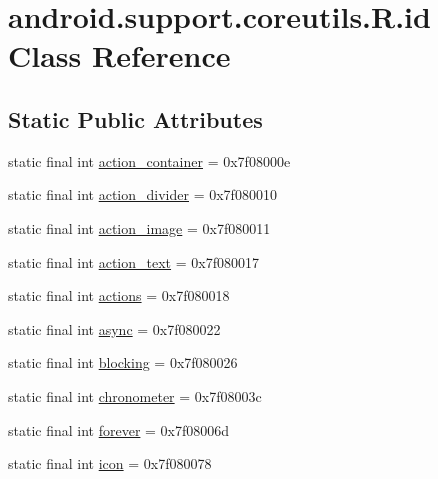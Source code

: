 \hypertarget{classandroid_1_1support_1_1coreutils_1_1R_1_1id}{}\section{android.\+support.\+coreutils.\+R.\+id Class Reference}
\label{classandroid_1_1support_1_1coreutils_1_1R_1_1id}
\subsection*{Static Public Attributes}
\begin{DoxyCompactItemize}
\item 
static final int \mbox{\hyperlink{classandroid_1_1support_1_1coreutils_1_1R_1_1id_acef2a9e85463b5b560ea32ce9cd47e6b}{action\+\_\+container}} = 0x7f08000e
\item 
static final int \mbox{\hyperlink{classandroid_1_1support_1_1coreutils_1_1R_1_1id_a9c73204912e07e7477a43af96d0e27c1}{action\+\_\+divider}} = 0x7f080010
\item 
static final int \mbox{\hyperlink{classandroid_1_1support_1_1coreutils_1_1R_1_1id_a6188476618345e0309d8f3e197f8b8de}{action\+\_\+image}} = 0x7f080011
\item 
static final int \mbox{\hyperlink{classandroid_1_1support_1_1coreutils_1_1R_1_1id_a2cc46f5d3c085d9a2ccd7ce052f355a6}{action\+\_\+text}} = 0x7f080017
\item 
static final int \mbox{\hyperlink{classandroid_1_1support_1_1coreutils_1_1R_1_1id_aa63244327deb89946fd022a87e166481}{actions}} = 0x7f080018
\item 
static final int \mbox{\hyperlink{classandroid_1_1support_1_1coreutils_1_1R_1_1id_a4927205f680e6c9b9bc3938c1b916cdc}{async}} = 0x7f080022
\item 
static final int \mbox{\hyperlink{classandroid_1_1support_1_1coreutils_1_1R_1_1id_a27c47c4fcebe9cfec13eb2467ad677f3}{blocking}} = 0x7f080026
\item 
static final int \mbox{\hyperlink{classandroid_1_1support_1_1coreutils_1_1R_1_1id_a43bb36ecac9e8cb1a87d851023111e72}{chronometer}} = 0x7f08003c
\item 
static final int \mbox{\hyperlink{classandroid_1_1support_1_1coreutils_1_1R_1_1id_a83f5015de0c8a0799dc5b817254727e6}{forever}} = 0x7f08006d
\item 
static final int \mbox{\hyperlink{classandroid_1_1support_1_1coreutils_1_1R_1_1id_a9469a9fd3e114f6a1203fceb64114328}{icon}} = 0x7f080078

\end{DoxyCompactItemize}
